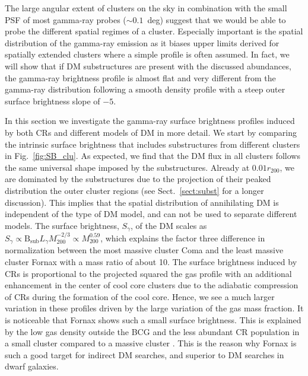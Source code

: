 \documentclass[10pt,aps,pra,reprint,amsmath,amsfonts,amssymb,showpacs,nofootinbib,floatfix]{revtex4-1}
\def\del#1{{}}
\newcommand{\rmn}{\mathrm}
\newcommand{\B}{\rmn{B}}
\newcommand{\bsub}{\B_\rmn{sub}}
\newcommand{\rvir}{r_{200}}
\newcommand{\mvir}{M_{200}}
\begin{document}
The large angular extent of clusters on the sky in combination with
the small PSF of most gamma-ray probes ($\sim 0.1$~deg) suggest that
we would be able to probe the different spatial regimes of a
cluster. Especially important is the spatial distribution of the
gamma-ray emission as it biases upper limits derived for spatially
extended clusters where a simple profile is often assumed. In fact, we
will show that if DM substructures are present with the discussed
abundances, the gamma-ray brightness profile is almost flat and very
different from the gamma-ray distribution following a smooth density
profile with a steep outer surface brightness slope of $-5$.

In this section we investigate the gamma-ray surface brightness
profiles induced by both CRs and different models of DM in more
detail. We start by comparing the intrinsic surface brightness that
includes substructures from different clusters in
Fig.~\ref{fig:SB_clu}. As expected, we find that the DM flux in all
clusters follows the same universal shape imposed by the
substructures. Already at $0.01\rvir$, we are dominated by the
substructures due to the projection of their peaked distribution the
outer cluster regions (see Sect.~\ref{sect:subst} for a longer
discussion). This implies that the spatial distribution of
annihilating DM is independent of the type of DM model, and can not be
used to separate different models. The surface brightness, $S_\gamma$,
of the DM scales as $S_\gamma\propto\bsub L_{\gamma} \mvir^{-2/3}
\propto \mvir^{0.59}$, which explains the factor three difference in
normalization between the most massive cluster Coma and the least
massive cluster Fornax with a mass ratio of about 10. \del{The flux
  from the LP model shows a smaller spread in the normalization which
  is due to the additional contribution from SFE with a negative mass
  trend, hence a flux normalization with a softer mass-scaling of
  $S_\gamma\propto\mvir^{0.06}$.} The surface brightness induced by
CRs is proportional to the projected squared the gas profile with an
additional enhancement in the center of cool core clusters due to the
adiabatic compression of CRs during the formation of the cool
core. Hence, we see a much larger variation in these profiles driven
by the large variation of the gas mass fraction. It is noticeable that
Fornax shows such a small surface brightness. This is explained by the
low gas density outside the BCG and the less abundant CR population in
a small cluster compared to a massive cluster
\cite{2010MNRAS.409..449P}.  This is the reason why Fornax is such a
good target for indirect DM searches, and superior to DM searches in
dwarf galaxies.
\end{document}
